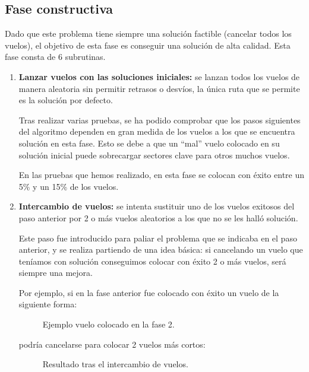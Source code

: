 \subsection{Fase constructiva}
Dado que este problema tiene siempre una solución factible (cancelar todos los vuelos), el objetivo de esta fase es conseguir una solución de alta calidad. Esta fase consta de 6 subrutinas.
\begin{enumerate}
	
	\item \textbf{Lanzar vuelos con las soluciones iniciales: }se lanzan todos los vuelos de manera aleatoria sin permitir retrasos o desvíos, la única ruta que se permite es la solución por defecto.
	
	Tras realizar varias pruebas, se ha podido comprobar que los pasos siguientes del algoritmo dependen en gran medida de los vuelos a los que se encuentra solución en esta fase. Esto se debe a que un ``mal'' vuelo colocado en su solución inicial puede sobrecargar sectores clave para otros muchos vuelos.
	
	En las pruebas que hemos realizado, en esta fase se colocan con éxito entre un 5\% y un 15\% de los vuelos.
	
	\item \textbf{Intercambio de vuelos: } se intenta sustituir uno de los vuelos exitosos del paso anterior por 2 o más vuelos aleatorios a los que no se les halló solución.
	
	Este paso fue introducido para paliar el problema que se indicaba en el paso anterior, y se realiza partiendo de una idea básica: si cancelando un vuelo que teníamos con solución conseguimos colocar con éxito 2 o más vuelos, será siempre una mejora.
	
	Por ejemplo, si en la fase anterior fue colocado con éxito un vuelo de la siguiente forma:
	\begin{figure}[H]
		\centering
		
		\caption{Ejemplo vuelo colocado en la fase 2.}
		\label{fig: Ejemplo vuelo colocado en la fase 2}
	\end{figure}
	
	podría cancelarse para colocar 2 vuelos más cortos:
	\begin{figure}[H]
		\centering
		\begin{minipage}[H]{0.4\textwidth}
			
		\end{minipage}
		\hfill
		\begin{minipage}[H]{0.4\textwidth}
			
		\end{minipage}
		\caption{Resultado tras el intercambio de vuelos.}
		\label{Fig: Resultado tras el intercambio de vuelos}
	\end{figure}
	

\end{enumerate}
